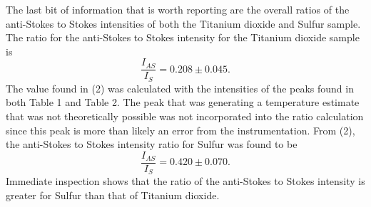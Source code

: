 \documentclass[twocolumn]{article}
\begin{document}
The last bit of information that is worth reporting are the overall ratios of the anti-Stokes to Stokes intensities of both the Titanium dioxide and Sulfur sample. The ratio for the anti-Stokes to Stokes intensity for the Titanium dioxide sample is 
\begin{equation}\label{2}
	\frac{I_{AS}}{I_{S}}=0.208 \pm 0.045.
\end{equation}
The value found in (2) was calculated with the intensities of the peaks found in both Table 1 and Table 2. The peak that was generating a temperature estimate that was not theoretically possible was not incorporated into the ratio calculation since this peak is more than likely an error from the instrumentation. From (2), the anti-Stokes to Stokes intensity ratio for Sulfur was found to be
\begin{equation}
	\frac{I_{AS}}{I_{S}}=0.420 \pm 0.070.
\end{equation}
Immediate inspection shows that the ratio of the anti-Stokes to Stokes intensity is greater for Sulfur than that of Titanium dioxide.
\end{document}
